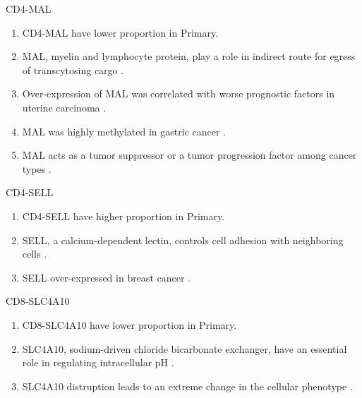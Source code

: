 \documentclass{beamer}
\begin{document}
\begin{frame}[allowframebreaks]
        \begin{block}{CD4-MAL}
            \begin{enumerate}
                \item CD4-MAL have lower proportion in Primary.
                \item MAL, myelin and lymphocyte protein, play a role in indirect route for egress of transcytosing cargo \cite{MAL-1}.
                \item Over-expression of MAL was correlated with worse prognostic factors in uterine carcinoma \cite{MAL-2}.
                \item MAL was highly methylated in gastric cancer \cite{MAL-3}.
                \item MAL acts as a tumor suppressor or a tumor progression factor among cancer types \cite{MAL-4}.
            \end{enumerate}
        \end{block}

        \begin{block}{CD4-SELL}
            \begin{enumerate}
                \item CD4-SELL have higher proportion in Primary.
                \item SELL, a calcium-dependent lectin, controls cell adhesion with neighboring cells \cite{SELL-1, SELL-2}.
                \item SELL over-expressed in breast cancer \cite{SELL-3}.
            \end{enumerate}
        \end{block}

        \begin{block}{CD8-SLC4A10}
            \begin{enumerate}
                \item CD8-SLC4A10 have lower proportion in Primary.
                \item SLC4A10, sodium-driven chloride bicarbonate exchanger, have an essential role in regulating intracellular pH \cite{SLC4A10-1}.
                \item SLC4A10 distruption leads to an extreme change in the cellular phenotype \cite{SLC4A10-2}.
            \end{enumerate}
        \end{block}
    \end{frame}
\end{document}
